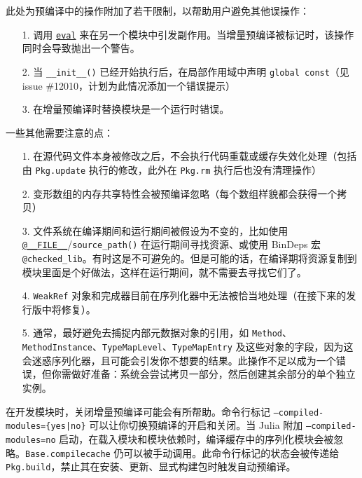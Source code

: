 此处为预编译中的操作附加了若干限制，以帮助用户避免其他误操作：



\begin{itemize}
\item[1. ] 调用 \hyperlink{7507639810592563424}{\texttt{eval}} 来在另一个模块中引发副作用。当增量预编译被标记时，该操作同时会导致抛出一个警告。


\item[2. ] 当 \texttt{\_\_init\_\_()} 已经开始执行后，在局部作用域中声明 \texttt{global const}（见 issue \#12010，计划为此情况添加一个错误提示）


\item[3. ] 在增量预编译时替换模块是一个运行时错误。

\end{itemize}


一些其他需要注意的点：



\begin{itemize}
\item[1. ] 在源代码文件本身被修改之后，不会执行代码重载或缓存失效化处理（包括由 \texttt{Pkg.update} 执行的修改，此外在 \texttt{Pkg.rm} 执行后也没有清理操作）


\item[2. ] 变形数组的内存共享特性会被预编译忽略（每个数组样貌都会获得一个拷贝）


\item[3. ] 文件系统在编译期间和运行期间被假设为不变的，比如使用 \hyperlink{1518763743618824993}{\texttt{@\_\_FILE\_\_}}/\texttt{source\_path()} 在运行期间寻找资源、或使用 BinDeps 宏 \texttt{@checked\_lib}。有时这是不可避免的。但是可能的话，在编译期将资源复制到模块里面是个好做法，这样在运行期间，就不需要去寻找它们了。


\item[4. ] \texttt{WeakRef} 对象和完成器目前在序列化器中无法被恰当地处理（在接下来的发行版中将修复）。


\item[5. ] 通常，最好避免去捕捉内部元数据对象的引用，如 \texttt{Method}、\texttt{MethodInstance}、\texttt{TypeMapLevel}、\texttt{TypeMapEntry} 及这些对象的字段，因为这会迷惑序列化器，且可能会引发你不想要的结果。此操作不足以成为一个错误，但你需做好准备：系统会尝试拷贝一部分，然后创建其余部分的单个独立实例。

\end{itemize}


在开发模块时，关闭增量预编译可能会有所帮助。命令行标记 \texttt{--compiled-modules=\{yes|no\}} 可以让你切换预编译的开启和关闭。当 Julia 附加 \texttt{--compiled-modules=no} 启动，在载入模块和模块依赖时，编译缓存中的序列化模块会被忽略。\texttt{Base.compilecache} 仍可以被手动调用。此命令行标记的状态会被传递给 \texttt{Pkg.build}，禁止其在安装、更新、显式构建包时触发自动预编译。



